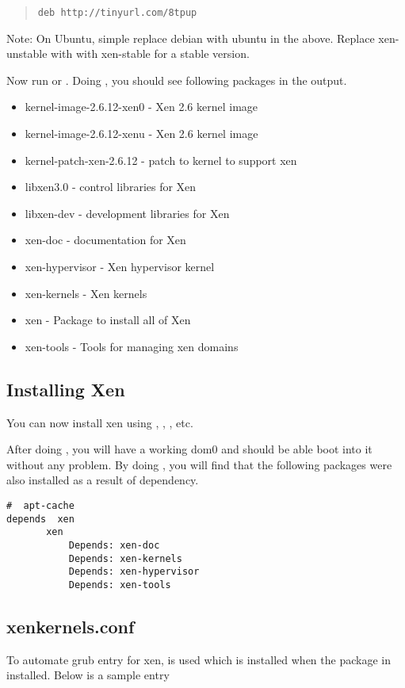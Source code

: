 \begin{quote}
{\small
\begin{verbatim}
deb http://tinyurl.com/8tpup
\end{verbatim}
}
\end{quote}
   
Note: On Ubuntu, simple replace debian with ubuntu in the above. Replace xen-unstable with with xen-stable for a stable version.

Now run  or . Doing , you should see following packages in the output.

\begin{itemize}
\item kernel-image-2.6.12-xen0 - Xen 2.6 kernel image
\item kernel-image-2.6.12-xenu - Xen 2.6 kernel image
\item kernel-patch-xen-2.6.12 - patch to kernel to support xen
\item libxen3.0 - control libraries for Xen
\item libxen-dev - development libraries for Xen
\item xen-doc - documentation for Xen
\item xen-hypervisor - Xen hypervisor kernel
\item xen-kernels - Xen kernels
\item xen - Package to install all of Xen
\item xen-tools - Tools for managing xen domains
\end{itemize}

\subsection{Installing Xen}
You can now install xen using , , , etc. 
 
After doing , you will have a working dom0 and should be able boot into it without any problem. By doing , you will find that the following packages were also installed as a result of dependency.

\begin{verbatim}
#  apt-cache  
depends  xen
       xen
           Depends: xen-doc
           Depends: xen-kernels
           Depends: xen-hypervisor
           Depends: xen-tools
\end{verbatim}


\subsection{xenkernels.conf}
To automate grub entry for xen,  is used which is installed when the package in installed. Below is a sample entry

